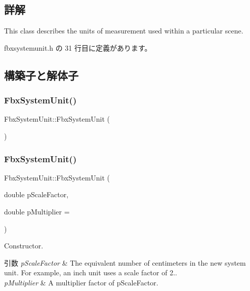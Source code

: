 \subsection{詳解}
This class describes the units of measurement used within a particular scene. 

 fbxsystemunit.\+h の 31 行目に定義があります。



\subsection{構築子と解体子}
\mbox{\label{class_fbx_system_unit_aec08a323b4e20c8c13fed7771370cace}} 
\subsubsection{\texorpdfstring{Fbx\+System\+Unit()}{FbxSystemUnit()}\hspace{0.1cm}{\footnotesize\ttfamily [1/2]}}
{\footnotesize\ttfamily Fbx\+System\+Unit\+::\+Fbx\+System\+Unit (\begin{DoxyParamCaption}{ }\end{DoxyParamCaption})}

\mbox{\label{class_fbx_system_unit_a6b265b9eccd00fbc09bb8064c9f3f7c4}} 
\subsubsection{\texorpdfstring{Fbx\+System\+Unit()}{FbxSystemUnit()}\hspace{0.1cm}{\footnotesize\ttfamily [2/2]}}
{\footnotesize\ttfamily Fbx\+System\+Unit\+::\+Fbx\+System\+Unit (\begin{DoxyParamCaption}\item[{double}]{p\+Scale\+Factor,  }\item[{double}]{p\+Multiplier = {} }\end{DoxyParamCaption})}

Constructor. 
\begin{DoxyParams}{引数}
{\em p\+Scale\+Factor} & The equivalent number of centimeters in the new system unit. For example, an inch unit uses a scale factor of 2.. \\
\hline
{\em p\+Multiplier} & A multiplier factor of p\+Scale\+Factor. \\
\hline
\end{DoxyParams}
\mbox{\label{class_fbx_system_unit_a151549b75cf9aadef6c943adb814122f}} 
